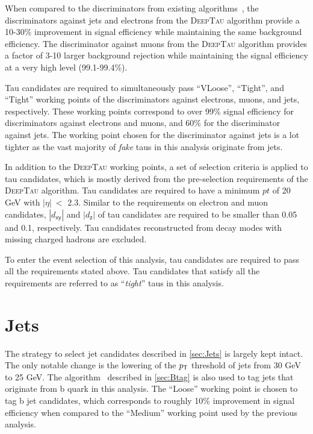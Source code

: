 When compared to the discriminators from existing algorithms~\cite{CMS:2018jrd,CMS:2015pac}, the discriminators against jets and electrons from the \textsc{DeepTau} algorithm provide a 10-30\% improvement in signal efficiency while maintaining the same background efficiency. The discriminator against muons from the \textsc{DeepTau} algorithm provides a factor of 3-10 larger background rejection while maintaining the signal efficiency at a very high level (99.1-99.4\%).

Tau candidates are required to simultaneously pass ``VLoose'', ``Tight'', and ``Tight'' working points of the discriminators against electrons, muons, and jets, respectively. These working points correspond to over 99\% signal efficiency for discriminators against electrons and muons, and 60\% for the discriminator against jets. The working point chosen for the discriminator against jets is a lot tighter as the vast majority of \emph{fake} taus in this analysis originate from jets.

In addition to the \textsc{DeepTau} working points, a set of selection criteria is applied to tau candidates, which is mostly derived from the pre-selection requirements of the \textsc{DeepTau} algorithm. Tau candidates are required to have a minimum $pt$ of 20 GeV with $|\eta|~<$ 2.3. Similar to the requirements on electron and muon candidates, $|d_{\textsf{xy}}|$ and $|d_{\textsf{z}}|$ of tau candidates are required to be smaller than 0.05 and 0.1, respectively. Tau candidates reconstructed from decay modes with missing charged hadrons are excluded.

To enter the event selection of this analysis, tau candidates are required to pass all the requirements stated above. Tau candidates that satisfy all the requirements are referred to as ``\emph{tight}'' taus in this analysis.

\section{Jets}
\label{sec:JME}

The strategy to select jet candidates described in \autoref{sec:Jets} is largely kept intact. The only notable change is the lowering of the $p_{\textsf{T}}$ threshold of jets from 30 GeV to 25 GeV. The \DeepJ algorithm~\cite{Bols:2020bkb} described in \autoref{sec:Btag} is also used to tag jets that originate from b quark in this analysis. The ``Loose'' working point is chosen to tag b jet candidates, which corresponds to roughly 10\% improvement in signal efficiency when compared to the ``Medium'' working point used by the previous analysis.
